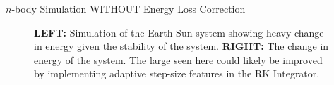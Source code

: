 \documentclass{beamer}
\begin{document}
\begin{frame}{$n$-body Simulation WITHOUT Energy Loss Correction}
        \begin{figure}[h]
        \centering
        \begin{minipage}{0.5\linewidth}
        \end{minipage}%
        \begin{minipage}{0.5\linewidth}
        \end{minipage}%
        \caption{\textbf{LEFT:} Simulation of the Earth-Sun system showing heavy
        change in energy given the stability of the system. \textbf{RIGHT:}
            The change in energy of the system. The large  seen here
            could likely be improved by implementing adaptive step-size
            features in the RK Integrator.}
    \end{figure}
\end{frame}
\end{document}
